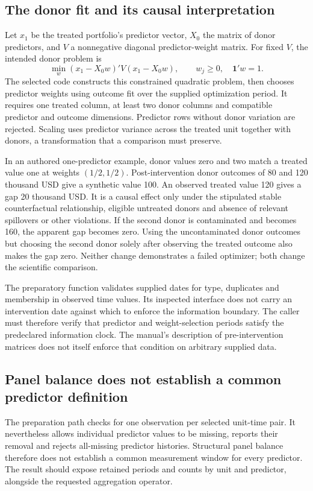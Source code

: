 \subsection{The donor fit and its causal interpretation}
Let $x_1$ be the treated portfolio's predictor vector, $X_0$ the matrix of
donor predictors, and $V$ a nonnegative diagonal predictor-weight matrix.
For fixed $V$, the intended donor problem is
\[
 \min_w (x_1-X_0w)'V(x_1-X_0w),
 \qquad w_j\geq0,\quad \mathbf{1}'w=1.
\]
The selected code constructs this constrained quadratic problem, then
chooses predictor weights using outcome fit over the supplied optimization
period. It requires one treated column, at least two donor columns and
compatible predictor and outcome dimensions. Predictor rows without donor
variation are rejected. Scaling uses predictor variance across the treated
unit together with donors, a transformation that a comparison must preserve.
\citep{exec24_synth_source,v12_sw_synth}

In an authored one-predictor example, donor values zero and two match a
treated value one at weights $(1/2,1/2)$. Post-intervention donor outcomes
of 80 and 120 thousand USD give a synthetic value 100. An observed treated
value 120 gives a gap 20 thousand USD. It is a causal effect only under
the stipulated stable counterfactual relationship, eligible untreated
donors and absence of relevant spillovers or other violations. If the
second donor is contaminated and becomes 160, the apparent gap becomes
zero. Using the uncontaminated donor outcomes but choosing the second donor
solely after observing the treated outcome also makes the gap zero. Neither change demonstrates a failed optimizer;
both change the scientific comparison.
\citep{exec24_synth_choice}

The preparatory function validates supplied dates for type, duplicates
and membership in observed time values. Its inspected interface does not
carry an intervention date against which to enforce the information
boundary. The caller must therefore verify that predictor and
weight-selection periods satisfy the predeclared information clock.
The manual's description of pre-intervention matrices does not itself
enforce that condition on arbitrary supplied data.
\citep{exec24_synth_source,v12_sw_synth}

\subsection{Panel balance does not establish a common predictor definition}
The preparation path checks for one observation per selected unit-time
pair. It nevertheless allows individual predictor values to be missing,
reports their removal and rejects all-missing predictor histories.
Structural panel balance therefore does not establish a common measurement
window for every predictor. The result should expose retained periods and
counts by unit and predictor, alongside the requested aggregation operator.
\citep{exec24_synth_source}

